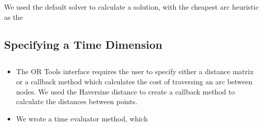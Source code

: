We used the default solver to calculate a solution, with the cheapest arc heuristic as the 



\subsection{Specifying a Time Dimension}

\subsection{}

\subsection{}


\begin{itemize}
    \item The OR Tools interface requires the user to specify either a distance matrix or a callback method which calculates the cost of traversing an arc between nodes. We used the Haversine distance to create a callback method to calculate the distances between points.
    \item We wrote a time evaluator method, which 
\end{itemize}



